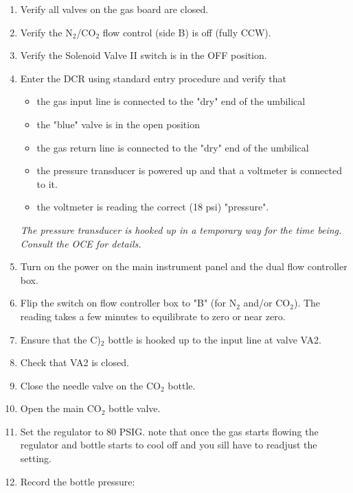 \documentclass[10pt]{article}
\begin{document}
\begin{enumerate}
\item \CheckBox[name=gbsp1]{} Verify all valves on the gas board are closed.
\item \CheckBox[name=gbsp2]{} Verify the N$_{2}$/CO$_{2}$ flow control (side B) is off (fully CCW).
\item \CheckBox[name=gbsp3]{} Verify the Solenoid Valve II switch is in the OFF position.
\item \CheckBox[name=gbsp4]{} Enter the DCR using standard entry procedure and verify that
\begin{itemize}
\item \CheckBox[name=gbsp4a]{} the gas input line is connected to the "dry" end of the umbilical
\item \CheckBox[name=gbsp4b]{} the "blue" valve is in the open position
\item \CheckBox[name=gbsp4c]{} the gas return line is connected to the "dry" end of the umbilical 
\item \CheckBox[name=gbsp4d]{} the pressure transducer is powered up and that a voltmeter is connected to it.
\item \CheckBox[name=gbsp4e]{} the voltmeter is reading the correct (18 psi) "pressure".
\end{itemize}
{\it The pressure transducer is hooked up in a temporary way for the time being. Consult the OCE for details.}
\item \CheckBox[name=gbsp5]{} Turn on the power on the main instrument panel and the dual flow controller box.
\item \CheckBox[name=gbsp6]{} Flip the switch on flow controller box to "B" (for N$_{2}$ and/or CO$_{2}$). The reading takes a few minutes to equilibrate to zero or near zero.
\item \CheckBox[name=gbsp7]{} Ensure that the C)$_{2}$ bottle is hooked up to the input line at valve VA2.
\item \CheckBox[name=gbsp8]{} Check that VA2 is closed.
\item \CheckBox[name=gbsp9]{} Close the needle valve on the CO$_2$ bottle.
\item \CheckBox[name=gbsp10]{} Open the main CO$_2$ bottle valve.
\item \CheckBox[name=gbsp11]{} Set the regulator to 80 PSIG. note that once the gas starts flowing the regulator and bottle starts to cool off and you sill have to readjust the setting.
\item \CheckBox[name=gbsp12]{} Record the bottle pressure:

\end{enumerate}
\end{document}
